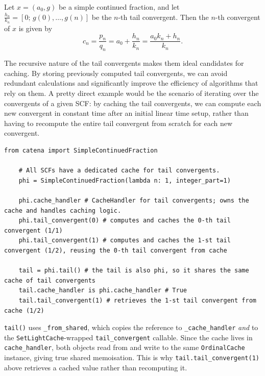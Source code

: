 \begin{corollary}
    Let $x = (a_0, g)$ be a simple continued fraction, and let 
    $\frac{h_n}{k_n} = [0;\, g(0), \ldots, g(n)]$ be the $n$-th tail convergent. 
    Then the $n$-th convergent of $x$ is given by
    \[
        c_n = \frac{p_n}{q_n} = a_0 + \frac{h_n}{k_n}
        = \frac{a_0 k_n + h_n}{k_n}.
    \]
\end{corollary}

\begin{remark}
    The recursive nature of the tail convergents makes them ideal candidates for caching. 
    By storing previously computed tail convergents, we can avoid redundant calculations 
    and significantly improve the efficiency of algorithms that rely on them. A pretty direct
    example would be the scenario of iterating over the convergents of a given SCF: 
    by caching the tail convergents, we can compute each new convergent in constant time after 
    an initial linear time setup, rather than having to recompute the entire tail convergent 
    from scratch for each new convergent.
\end{remark}

\begin{catenadef}
\begin{lstlisting}[style=python]
    from catena import SimpleContinuedFraction

    # All SCFs have a dedicated cache for tail convergents.
    phi = SimpleContinuedFraction(lambda n: 1, integer_part=1)

    phi.cache_handler # CacheHandler for tail convergents; owns the cache and handles caching logic.
    phi.tail_convergent(0) # computes and caches the 0-th tail convergent (1/1)
    phi.tail_convergent(1) # computes and caches the 1-st tail convergent (1/2), reusing the 0-th tail convergent from cache
    
    tail = phi.tail() # the tail is also phi, so it shares the same cache of tail convergents
    tail.cache_handler is phi.cache_handler # True
    tail.tail_convergent(1) # retrieves the 1-st tail convergent from cache (1/2)
\end{lstlisting}
\end{catenadef}

\begin{remark}
  \texttt{tail()} uses \texttt{\_from\_shared}, which copies the reference
  to \texttt{\_cache\_handler} \emph{and} to the \texttt{SetLightCache}-wrapped
  \texttt{tail\_convergent} callable.  Since the cache lives in
  \texttt{cache\_handler}, both objects read from and write to the
  same \texttt{OrdinalCache} instance, giving true shared memoisation.
  This is why \texttt{tail.tail\_convergent(1)} above retrieves a cached
  value rather than recomputing it.
\end{remark}

